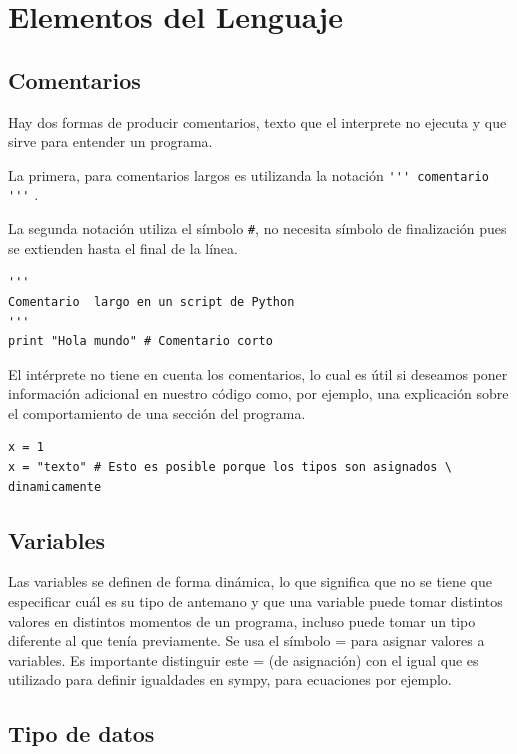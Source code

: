 \section{Elementos del Lenguaje}

\subsection{Comentarios}

Hay dos formas de producir comentarios, texto que el interprete  no ejecuta y que sirve para entender un programa.

La primera, para comentarios largos es utilizanda la notación \linebreak\verb~''' comentario '''~ .


 La segunda notación utiliza el símbolo \verb~#~, no necesita símbolo de finalización pues se extienden hasta el final de la línea.

 \begin{lstlisting}
'''
Comentario  largo en un script de Python
'''
print "Hola mundo" # Comentario corto
\end{lstlisting}

El intérprete no tiene en cuenta los comentarios, lo cual es útil si deseamos poner información adicional en nuestro código como, por ejemplo, una explicación sobre el comportamiento de una sección del programa.






\begin{lstlisting}
x = 1
x = "texto" # Esto es posible porque los tipos son asignados \
dinamicamente
\end{lstlisting}



\subsection{Variables}
Las variables se definen de forma dinámica, lo que significa que no se tiene que especificar cuál es su tipo de antemano y que una variable puede tomar distintos valores en distintos momentos de un programa, incluso puede tomar
 un tipo diferente al que tenía previamente. Se usa el símbolo = para asignar valores a variables. Es importante distinguir este = (de asignación) con el igual que es utilizado para definir igualdades en sympy, para ecuaciones por ejemplo.




\subsection{Tipo de datos}


